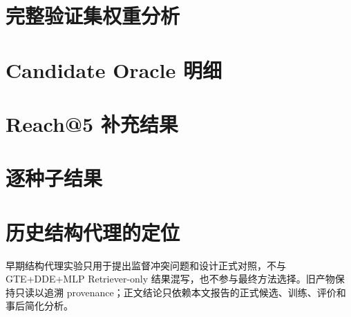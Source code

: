 \documentclass[sigconf,review,anonymous]{acmart}
\begin{document}
\section{完整验证集权重分析}

\begin{table}[h]
  \centering
  \caption{各领域验证集 APC-MRR（\%）。粗体为领域选择；全局领域等权最优为 $\lambda=\GlobalValidationLambda$。}
  \label{tab:lambda}
  \resizebox{0.84\textwidth}{!}{}
\end{table}
\clearpage

\section{Candidate Oracle 明细}

\begin{table}[H]
  \centering
  \caption{固定候选池中的完整答案路径上限。宏平均对领域等权。}
  \label{tab:oracle}
  \resizebox{\columnwidth}{!}{}
\end{table}

\section{Reach@5 补充结果}

\begin{table}[H]
  \centering
  \caption{固定屏蔽比较的 Reach@5（\%）；该指标未用于方法选择。}
  \label{tab:reach-five}
  \resizebox{\columnwidth}{!}{}
\end{table}

\section{逐种子结果}

\begin{table}[h]
  \centering
  \caption{每个训练种子的领域等权宏结果（\%）。配对统计仍先在问题上平均种子；本表只用于展示运行间波动。}
  \label{tab:per-seed}
  \resizebox{0.82\textwidth}{!}{}
\end{table}

\section{历史结构代理的定位}

早期结构代理实验只用于提出监督冲突问题和设计正式对照，不与 GTE+DDE+MLP Retriever-only 结果混写，也不参与最终方法选择。旧产物保持只读以追溯 provenance；正文结论只依赖本文报告的正式候选、训练、评价和事后简化分析。
\end{document}
